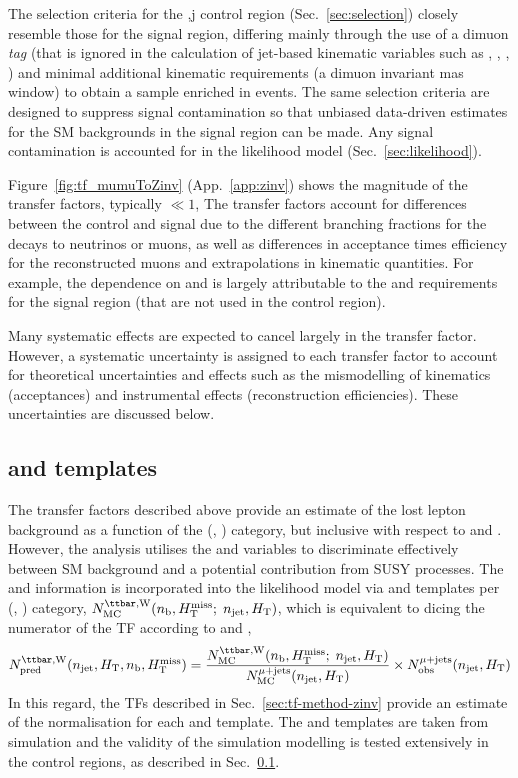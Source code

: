 The selection criteria for the \m,j control region
(Sec.~\ref{sec:selection}) closely resemble those for the signal
region, differing mainly through the use of a dimuon {\it tag} (that
is ignored in the calculation of jet-based kinematic variables such as
\scalht, \mht, \alphat, \etc) and minimal additional kinematic
requirements (\eg a dimuon invariant mas window) to obtain a sample
enriched in \zmmj events. The same selection criteria are designed to
suppress signal contamination so that unbiased data-driven estimates
for the SM backgrounds in the signal region can be made. Any signal
contamination is accounted for in the likelihood model
(Sec.~\ref{sec:likelihood}).

Figure~\ref{fig:tf_mumuToZinv} (App.~\ref{app:zinv}) shows the
magnitude of the transfer factors, typically $\ll 1$, The transfer
factors account for differences between the \mmj control and signal
due to the different branching fractions for the decays to neutrinos
or muons, as well as differences in acceptance times efficiency for
the reconstructed muons and extrapolations in kinematic
quantities. For example, the dependence on \njet and \scalht is
largely attributable to the \alphat and \bdphi requirements for the
signal region (that are not used in the \mmj control region).

Many systematic effects are expected to cancel largely in the transfer
factor. However, a systematic uncertainty is assigned to each transfer
factor to account for theoretical uncertainties and effects such as
the mismodelling of kinematics (\eg acceptances) and instrumental
effects (\eg reconstruction efficiencies). These uncertainties are
discussed below. 

\subsection{\texorpdfstring{\nb}{Nb} and \texorpdfstring{\mht}{MHT} templates}

The transfer factors described above provide an estimate of the lost
lepton background as a function of the (\njet, \scalht) category, but
inclusive with respect to \nb and \mht. However, the analysis utilises
the \nb and \mht variables to discriminate effectively between SM
background and \eg a potential contribution from SUSY processes. The
\nb and \HTmiss information is incorporated into the likelihood model
via \nb and \mht templates per (\njet, \scalht) category, $N_{\rm
  MC}^{\ttw}(\nb, \HTmiss;\; \njet, \scalht)$, which is equivalent to
dicing the numerator of the TF according to \nb and \mht, \ie
\begin{equation}
  \label{equ:pred-method}
  \npre^{\ttw}(\njet, \scalht, \nb, \HTmiss) = 
  \frac{N_{\rm MC}^{\ttw}(\nb, \HTmiss;\; \njet, \scalht)}{N_{\rm MC}^{\mj}(\njet, \scalht)} 
  \times 
  \nobs^{\mj}(\njet, \scalht)
\end{equation}
In this regard, the TFs described in Sec.~\ref{sec:tf-method-zinv}
provide an estimate of the normalisation for each \nb and \mht
template. The \nb and \HTmiss templates are taken from simulation and
the validity of the simulation modelling is tested extensively in the
control regions, as described in Sec.~\ref{}.

